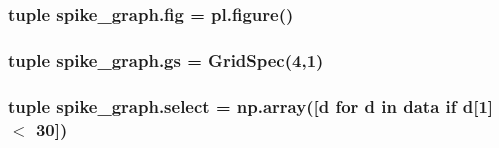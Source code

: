 \hypertarget{namespacespike__graph_a6f0be72cbf414e636c92c1ed77515c1d}{
\subsubsection[{fig}]{\setlength{\rightskip}{0pt plus 5cm}tuple spike\-\_\-graph.\-fig = pl.\-figure()}}\label{namespacespike__graph_a6f0be72cbf414e636c92c1ed77515c1d}
\hypertarget{namespacespike__graph_ac04ae7194fd2b19e10cbf2db5aa59152}{
\subsubsection[{gs}]{\setlength{\rightskip}{0pt plus 5cm}tuple spike\-\_\-graph.\-gs = Grid\-Spec(4,1)}}\label{namespacespike__graph_ac04ae7194fd2b19e10cbf2db5aa59152}
\hypertarget{namespacespike__graph_a0f1ea338f80e69a3131a5e1ebcda2fb7}{
\subsubsection[{select}]{\setlength{\rightskip}{0pt plus 5cm}tuple spike\-\_\-graph.\-select = np.\-array(\mbox{[}d for d in {\bf data} if d\mbox{[}1\mbox{]} $<$ 30\mbox{]})}}\label{namespacespike__graph_a0f1ea338f80e69a3131a5e1ebcda2fb7}
